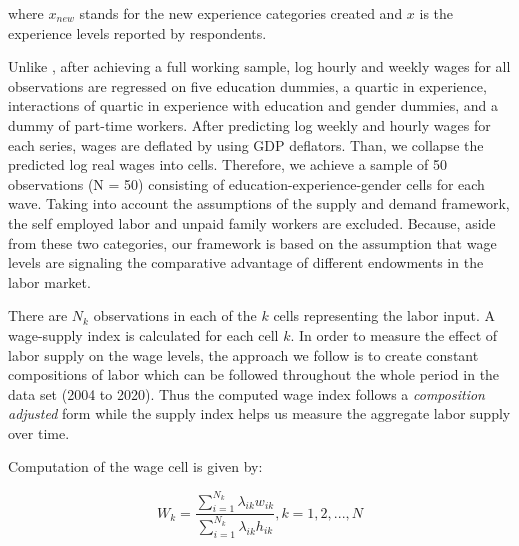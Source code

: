 \begin{onehalfspace}
where $x_{new}$ stands for the new experience categories created
and $x$ is the experience levels reported by respondents.

Unlike \citet{2015Bakis}, after achieving a full working sample,
log hourly and weekly wages for all observations are regressed on
five education dummies, a quartic in experience, interactions of quartic
in experience with education and gender dummies, and a dummy of part-time
workers. After predicting log weekly and hourly wages for each series,
wages are deflated by using GDP deflators. Than, we collapse the predicted
log real wages into cells. Therefore, we achieve a sample of 50 observations
(N = 50) consisting of education-experience-gender cells for each
wave. Taking into account the assumptions of the supply and demand
framework, the self employed labor and unpaid family workers are excluded.
Because, aside from these two categories, our framework is based on
the assumption that wage levels are signaling the comparative advantage
of different endowments in the labor market.

There are $N_{k}$ observations in each of the $k$ cells representing
the labor input. A wage-supply index is calculated for each cell $k$.
In order to measure the effect of labor supply on the wage levels,
the approach we follow is to create constant compositions of labor
which can be followed throughout the whole period in the data set
(2004 to 2020). Thus the computed wage index follows a \emph{composition
adjusted} form while the supply index helps us measure the aggregate
labor supply over time.

Computation of the wage cell is given by:%

\[
W_{k}=\dfrac{\sum_{i=1}^{N_{k}}{\lambda_{ik}w_{ik}}}{\sum_{i=1}^{N_{k}}{\lambda_{ik}h_{ik}}},k=1,2,...,N
\]

\end{onehalfspace}

